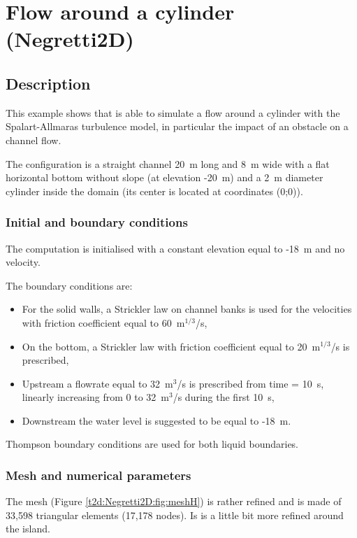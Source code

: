 \chapter{Flow around a cylinder (Negretti2D)}

\section{Description}

This example shows that  is able to simulate a flow around
a cylinder with the Spalart-Allmaras turbulence model,
in particular the impact of an obstacle on a channel flow.

The configuration is a straight channel 20~m long and 8~m wide
with a flat horizontal bottom without slope (at elevation -20~m)
and a 2~m diameter cylinder inside the domain
(its center is located at coordinates (0;0)).

\subsection{Initial and boundary conditions}

The computation is initialised with a constant elevation equal to -18~m
and no velocity.

The boundary conditions are:
\begin{itemize}
\item For the solid walls, a Strickler law on channel banks is used for the
velocities with friction coefficient equal to 60~m$^{1/3}$/s,
\item On the bottom, a Strickler law with friction coefficient equal to
20~m$^{1/3}$/s is prescribed,
\item Upstream a flowrate equal to 32~m$^3$/s is prescribed from time = 10~s,
linearly increasing from 0 to 32~m$^3$/s during the first 10~s,
\item Downstream the water level is suggested to be equal to -18~m.
\end{itemize}

Thompson boundary conditions are used for both liquid boundaries.

\subsection{Mesh and numerical parameters}

The mesh (Figure \ref{t2d:Negretti2D:fig:meshH})
is rather refined and is made of 33,598 triangular elements (17,178 nodes).
Is is a little bit more refined around the island.

